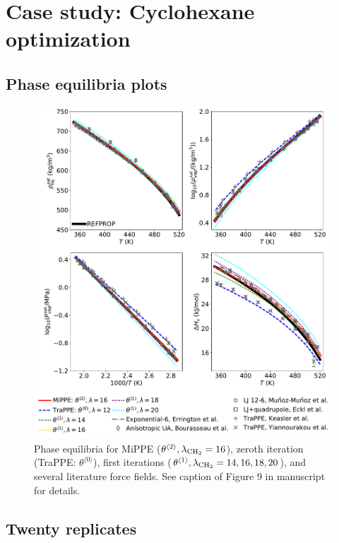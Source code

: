 \documentclass[journal=jctc,manuscript=article]{achemso}
\begin{document}
\newpage
\clearpage

\section{Case study: Cyclohexane optimization} \label{SI sec: Case study}

\subsection{Phase equilibria plots}

	\begin{figure}[H]
		\centering
		\includegraphics[width=5.8in]{CYC6_VLE_iterations.pdf}
		\caption{Phase equilibria for MiPPE ($\theta^{\langle2\rangle}, \lambda_{\rm CH_2} = 16$), zeroth iteration (TraPPE: $\theta^{\langle0\rangle}$), first iterations ($\theta^{\langle1\rangle}, \lambda_{\rm CH_2} = 14, 16, 18, 20$), and several literature force fields. See caption of Figure 9 in manuscript for details.}
		\label{SI fig: VLE cyclohexane}
	\end{figure}

\newpage
\clearpage

\subsection{Twenty replicates}
\end{document}
